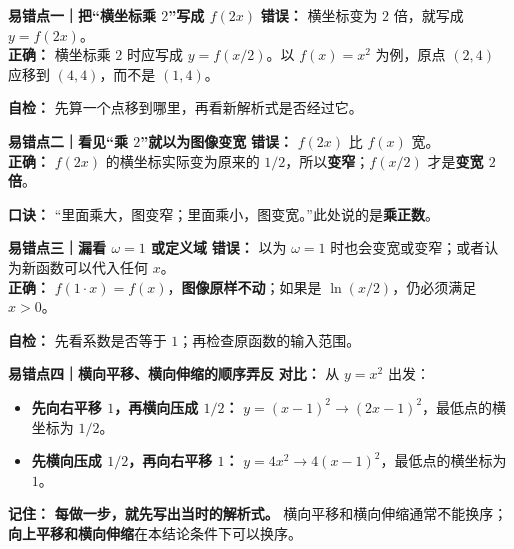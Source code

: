 \begin{trapbox}
  \textbf{\textcolor{CTrap}{易错点一｜把“横坐标乘 $2$”写成 $f(2x)$}}
  \textbf{错误：} 横坐标变为 $2$ 倍，就写成 $y=f(2x)$。\\
  \textbf{正确：} 横坐标乘 $2$ 时应写成 $y=f(x/2)$。以 $f(x)=x^2$ 为例，原点 $(2,4)$ 应移到 $(4,4)$，而不是 $(1,4)$。
  \begin{center}
  
  \end{center}
  \textbf{自检：} 先算一个点移到哪里，再看新解析式是否经过它。

  \medskip
  \textbf{\textcolor{CTrap}{易错点二｜看见“乘 $2$”就以为图像变宽}}
  \textbf{错误：} $f(2x)$ 比 $f(x)$ 宽。\\
  \textbf{正确：} $f(2x)$ 的横坐标实际变为原来的 $1/2$，所以\textbf{变窄}；$f(x/2)$ 才是\textbf{变宽 $2$ 倍}。
  \begin{center}
  
  \end{center}
  \textbf{口诀：} “里面乘大，图变窄；里面乘小，图变宽。”此处说的是\textbf{乘正数}。

  \medskip
  \textbf{\textcolor{CTrap}{易错点三｜漏看 $\omega=1$ 或定义域}}
  \textbf{错误：} 以为 $\omega=1$ 时也会变宽或变窄；或者认为新函数可以代入任何 $x$。\\
  \textbf{正确：} $f(1\cdot x)=f(x)$，\textbf{图像原样不动}；如果是 $\ln(x/2)$，仍必须满足 $x>0$。
  \begin{center}
  
  \end{center}
  \textbf{自检：} 先看系数是否等于 $1$；再检查原函数的输入范围。

  \medskip
  \textbf{\textcolor{CTrap}{易错点四｜横向平移、横向伸缩的顺序弄反}}
  \textbf{对比：} 从 $y=x^2$ 出发：
  \begin{itemize}[leftmargin=*,itemsep=0.2em,topsep=0.2em]
    \item \textbf{先向右平移 $1$，再横向压成 $1/2$：} $y=(x-1)^2\to (2x-1)^2$，最低点的横坐标为 $1/2$。
    \item \textbf{先横向压成 $1/2$，再向右平移 $1$：} $y=4x^2\to 4(x-1)^2$，最低点的横坐标为 $1$。
  \end{itemize}
  \begin{center}
  
  \end{center}
  \textbf{记住：} \textbf{每做一步，就先写出当时的解析式。} 横向平移和横向伸缩通常不能换序；\textbf{向上平移和横向伸缩}在本结论条件下可以换序。
\end{trapbox}
